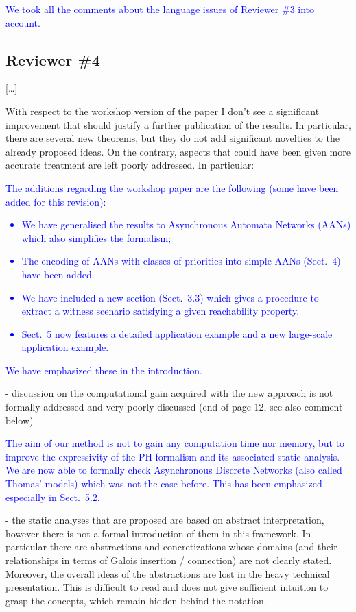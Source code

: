 \documentclass[11pt]{article}
\newcommand{\answer}[1]{\textcolor{blue}{#1}\vspace*{1em}}
\begin{document}
\answer{
We took all the comments about the language issues of Reviewer \#3 into account.
}



\subsection*{Reviewer \#4}

[…]

With respect to the workshop version of the paper I don't see a significant improvement that should justify a further publication of the results. In particular, there are several new theorems, but they do not add significant novelties to the already proposed ideas. On the contrary, aspects that could have been given more accurate treatment are left poorly addressed. In particular:

\answer{
The additions regarding the workshop paper are the following
(some have been added for this revision):
\begin{itemize}
  \item We have generalised the results to Asynchronous Automata
    Networks (AANs) which also simplifies the formalism;
  \item The encoding of AANs with classes of priorities into simple AANs
    (Sect.~4) have been added.
  \item We have included a new section (Sect.~3.3)
    which gives a procedure to extract a witness scenario
    satisfying a given reachability property.
  \item Sect.~5 now features a detailed application example
    and a new large-scale application example.
\end{itemize}
We have emphasized these in the introduction.
}

- discussion on the computational gain acquired with the new approach is not formally addressed and very poorly discussed (end of page 12, see also comment below)

\answer{
The aim of our method is not to gain any computation time nor memory,
but to improve the expressivity of the PH formalism and its associated static analysis.
We are now able to formally check Asynchronous Discrete Networks
(also called Thomas' models)
which was not the case before.
This has been emphasized especially in Sect.~5.2.
}

- the static analyses that are proposed are based on abstract interpretation, however there is not a formal introduction of them in this framework. In particular there are abstractions and concretizations whose domains (and their relationships in terms of Galois insertion / connection) are not clearly stated. Moreover, the overall ideas of the abstractions are lost in the heavy technical presentation. This is difficult to read and does not give sufficient intuition to grasp the concepts, which remain hidden behind the notation. 
\end{document}

